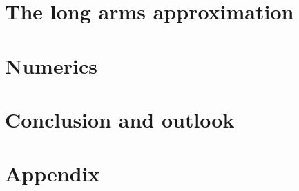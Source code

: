 \documentclass[10pt,a4paper, twoside]{article}
\numberwithin{equation}{section}
\theoremstyle{plain}
\theoremstyle{plain}
\theoremstyle{plain}
\theoremstyle{remark}
\theoremstyle{definition}
\theoremstyle{definition}
\theoremstyle{plain}
\theoremstyle{plain}
\begin{document}
\section{The long arms approximation}

\section{Numerics}


\section{Conclusion and outlook}


\section{Appendix}

\newpage

\printbibliography[title = Bibliography]
\end{document}
